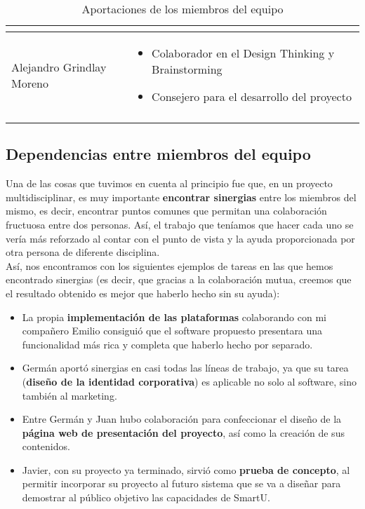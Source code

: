 \begin{longtable}{|m{4.5cm}|m{6.5cm}|}
\begin{itemize}
        \end{itemize} \\
    \hline
        Alejandro Grindlay Moreno & \begin{itemize}
            \item Colaborador en el Design Thinking y Brainstorming
            \item Consejero para el desarrollo del proyecto
        \end{itemize} \\
    \hline
    \caption{Aportaciones de los miembros del equipo}\label{tareassmartu}\\
\end{longtable}

\subsection{Dependencias entre miembros del equipo}
Una de las cosas que tuvimos en cuenta al principio fue que, en un proyecto multidisciplinar, es muy importante \textbf{encontrar sinergias} entre los miembros del mismo, es decir, encontrar puntos comunes que permitan una colaboración fructuosa entre dos personas. Así, el trabajo que teníamos que hacer cada uno se vería más reforzado al contar con el punto de vista y la ayuda proporcionada por otra persona de diferente disciplina.\\

Así, nos encontramos con los siguientes ejemplos de tareas en las que hemos encontrado sinergias (es decir, que gracias a la colaboración mutua, creemos que el resultado obtenido es mejor que haberlo hecho sin su ayuda):

\begin{itemize}
    \item La propia \textbf{implementación de las plataformas} colaborando con mi compañero Emilio consiguió que el software propuesto presentara una funcionalidad más rica y completa que haberlo hecho por separado.
    \item Germán aportó sinergias en casi todas las líneas de trabajo, ya que su tarea (\textbf{diseño de la identidad corporativa}) es aplicable no solo al software, sino también al marketing.
    \item Entre Germán y Juan hubo colaboración para confeccionar el diseño de la \textbf{página web de presentación del proyecto}, así como la creación de sus contenidos.
    \item Javier, con su proyecto ya terminado, sirvió como \textbf{prueba de concepto}, al permitir incorporar su proyecto al futuro sistema que se va a diseñar para demostrar al público objetivo las capacidades de SmartU.
\end{itemize}

